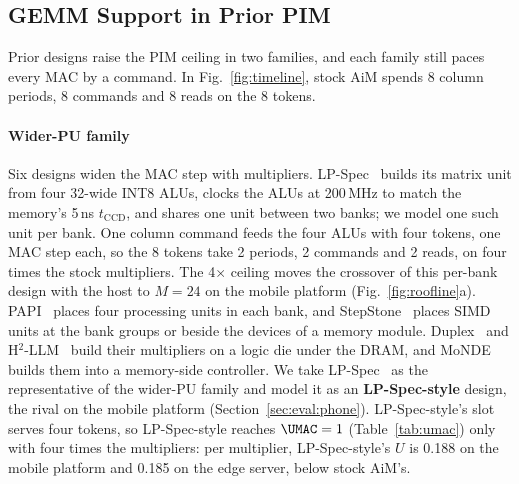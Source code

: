 \subsection{GEMM Support in Prior PIM}
\label{sec:bg:walls}

Prior designs raise the PIM ceiling in two families, and each family still paces every MAC by a command.
In Fig.~\ref{fig:timeline}, stock AiM spends 8 column periods, 8 commands and 8 reads on the 8 tokens.

\begin{table}[t]
  \caption{Useful-MAC utilization on the mobile platform.}
  \label{tab:umac}
  \centering
  \footnotesize
  \setlength{\tabcolsep}{3pt}
  
\end{table}

\paragraph{Wider-PU family}
Six designs widen the MAC step with multipliers. LP-Spec~\cite{lpspec} builds its matrix unit from four 32-wide INT8
ALUs, clocks the ALUs at 200\,MHz to match the memory's 5\,ns $t_\mathrm{CCD}$, and shares one unit between two banks;
we model one such unit per bank. One column command feeds the four ALUs with four tokens, one MAC step each, so the 8
tokens take 2 periods, 2 commands and 2 reads, on four times the stock multipliers. The 4$\times$ ceiling moves the
crossover of this per-bank design with the host to $M = 24$ on the mobile platform (Fig.~\ref{fig:roofline}a).
PAPI~\cite{papi} places four processing units in each bank, and StepStone~\cite{stepstone} places SIMD units at the
bank groups or beside the devices of a memory module. Duplex~\cite{duplex} and H$^2$-LLM~\cite{h2llm} build their
multipliers on a logic die under the DRAM, and MoNDE~\cite{monde} builds them into a memory-side controller. We take
LP-Spec~\cite{lpspec} as the representative of the wider-PU family and model it as an \textbf{LP-Spec-style} design,
the rival on the mobile platform (Section~\ref{sec:eval:phone}). LP-Spec-style's slot serves four tokens, so
LP-Spec-style reaches $\UMAC = 1$ (Table~\ref{tab:umac}) only with four times the multipliers: per multiplier,
LP-Spec-style's $U$ is 0.188 on the mobile platform and 0.185 on the edge server, below stock AiM's.

